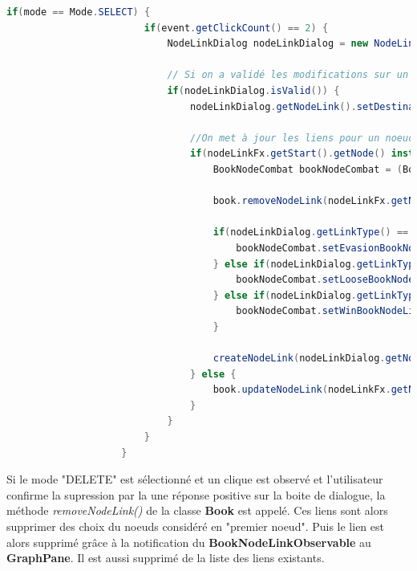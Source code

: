 				\begin{lstlisting}[gobble=12, language=java, caption=Classe NodeLinkFxListener avec le mode SELECT]
					if(mode == Mode.SELECT) {
						if(event.getClickCount() == 2) {
							NodeLinkDialog nodeLinkDialog = new NodeLinkDialog(nodeLinkFx.getNodeLink(), nodeLinkFx.getStart().getNode(), book);

							// Si on a validé les modifications sur un lien
							if(nodeLinkDialog.isValid()) {
								nodeLinkDialog.getNodeLink().setDestination(book.getNodeIndex(nodeLinkFx.getEnd().getNode()));

								//On met à jour les liens pour un noeud de combat
								if(nodeLinkFx.getStart().getNode() instanceof BookNodeCombat) {
									BookNodeCombat bookNodeCombat = (BookNodeCombat) nodeLinkFx.getStart().getNode();

									book.removeNodeLink(nodeLinkFx.getNodeLink());

									if(nodeLinkDialog.getLinkType() == NodeLinkDialog.EVASION) {
										bookNodeCombat.setEvasionBookNodeLink(nodeLinkDialog.getNodeLink());
									} else if(nodeLinkDialog.getLinkType() == NodeLinkDialog.PERDRE) {
										bookNodeCombat.setLooseBookNodeLink(nodeLinkDialog.getNodeLink());
									} else if(nodeLinkDialog.getLinkType() == NodeLinkDialog.GAGNE) {
										bookNodeCombat.setWinBookNodeLink(nodeLinkDialog.getNodeLink());
									}

									createNodeLink(nodeLinkDialog.getNodeLink(), nodeLinkFx.getStart(), nodeLinkFx.getEnd());
								} else {
									book.updateNodeLink(nodeLinkFx.getNodeLink(), nodeLinkDialog.getNodeLink());
								}
							}
						}
					}
				\end{lstlisting}

				Si le mode "DELETE" est sélectionné et un clique est observé et l'utilisateur confirme la supression par la une réponse positive sur la boite de dialogue, la méthode \textit{removeNodeLink()} de la classe \textbf{Book} est appelé. Ces liens sont alors supprimer des choix du noeuds considéré en "premier noeud". Puis le lien est alors supprimé grâce à la notification du \textbf{BookNodeLinkObservable} au \textbf{GraphPane}. Il est aussi supprimé de la liste des liens existants.

